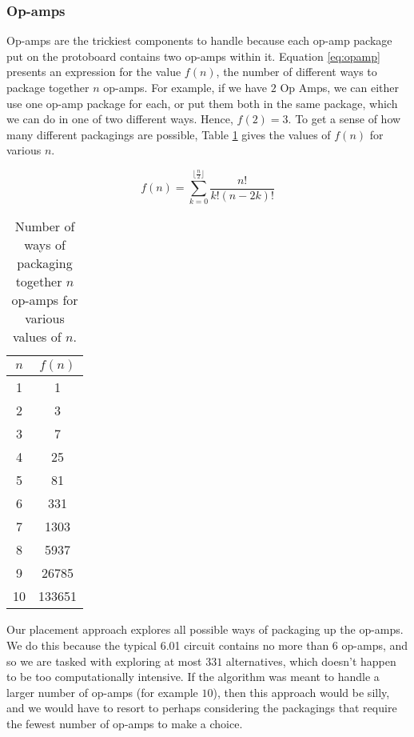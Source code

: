 \subsubsection{Op-amps}

Op-amps are the trickiest components to handle because each op-amp package put
on the protoboard contains two op-amps within it. Equation
\ref{eq:opamp} presents an expression for the value $f(n)$, the number of
different ways to package together $n$ op-amps. For example, if we have $2$ Op
Amps, we can either use one op-amp package for each, or put them both in the
same package, which we can do in one of two different ways. Hence, $f(2) = 3$.
To get a sense of how many different packagings are possible, Table
\ref{tb:opamp} gives the values of $f(n)$ for various $n$.

\begin{equation}
f(n) = \sum\limits_{k=0}^{\lfloor\frac{n}{2}\rfloor}{\frac{n!}{k!(n - 2k)!}}
\label{eq:opamp}
\end{equation}

\begin{table}
\begin{center}
\begin{singlespace}
\begin{tabular}{c | c}
$n$ & $f(n)$ \\
\hline
\hline
1 & 1 \\
2 & 3 \\
3 & 7 \\
4 & 25 \\
5 & 81 \\
6 & 331 \\
7 & 1303 \\
8 & 5937 \\
9 & 26785 \\
10 & 133651
\end{tabular}
\end{singlespace}
\end{center}
\label{tb:opamp}
\caption{Number of ways of packaging together $n$ op-amps for various values of
$n$.}
\end{table}

Our placement approach explores all possible ways
of packaging up the op-amps. We do this because the typical 6.01 circuit contains
no more than $6$ op-amps, and so we are tasked with exploring at most $331$
alternatives, which doesn't happen to be too computationally intensive. If the
algorithm was meant to handle a larger number of op-amps (for example $10$), then
this approach would be silly, and we would have to resort to perhaps considering
the packagings that require the fewest number of op-amps to make a choice.

